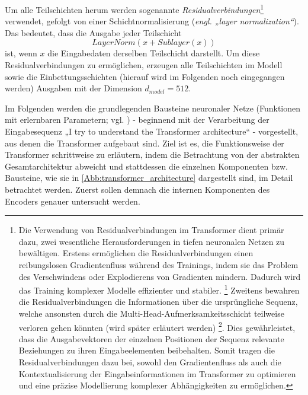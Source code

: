 Um alle Teilschichten herum werden sogenannte \emph{Residualverbindungen}\footnote{Die Verwendung von Residualverbindungen im Transformer dient primär dazu, zwei wesentliche Herausforderungen in tiefen neuronalen Netzen zu bewältigen. Erstens ermöglichen die Residualverbindungen einen reibungslosen Gradientenfluss während des Trainings, indem sie das Problem des Verschwindens oder Explodierens von Gradienten mindern. Dadurch wird das Training komplexer Modelle effizienter und stabiler. \footcite{Residual_Connections} Zweitens bewahren die Residualverbindungen die Informationen über die ursprüngliche Sequenz, welche ansonsten durch die Multi-Head-Aufmerksamkeitsschicht teilweise verloren gehen könnten (wird später erläutert werden) \footcite{Attention_is_all_you_need}. Dies gewährleistet, dass die Ausgabevektoren der einzelnen Positionen der Sequenz relevante Beziehungen zu ihren Eingabeelementen beibehalten. Somit tragen die Residualverbindungen dazu bei, sowohl den Gradientenfluss als auch die Kontextualisierung der Eingabeinformationen im Transformer zu optimieren und eine präzise Modellierung komplexer Abhängigkeiten zu ermöglichen.} verwendet, gefolgt von einer Schichtnormalisierung (\emph{engl. „layer normalization“}). Das bedeutet, dass die Ausgabe jeder Teilschicht $$LayerNorm(x + Sublayer(x))$$ ist, wenn $x$ die Eingabedaten derselben Teilschicht darstellt. Um diese Residualverbindungen zu ermöglichen, erzeugen alle Teilschichten im Modell sowie die Einbettungsschichten (hierauf wird im Folgenden noch eingegangen werden) Ausgaben mit der Dimension $d_{model}=512$.

Im Folgenden werden die grundlegenden Bausteine neuronaler Netze (Funktionen mit erlernbaren Parametern; vgl. \cite{Formal_Algorithms_for_Transformers_DeepMind}) - beginnend mit der Verarbeitung der Eingabesequenz „I try to understand the Transformer architecture“ - vorgestellt, aus denen die Transformer aufgebaut sind. Ziel ist es, die Funktionsweise der Transformer schrittweise zu erläutern, indem die Betrachtung von der abstrakten Gesamtarchitektur abweicht und stattdessen die einzelnen Komponenten bzw. Bausteine, wie sie in \cref{Abb:transformer_architecture} dargestellt sind, im Detail betrachtet werden. Zuerst sollen demnach die internen Komponenten des Encoders genauer untersucht werden. 

